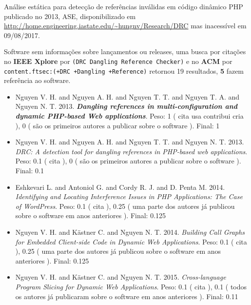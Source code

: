 Análise estática para detecção de referências inválidas em código dinâmico PHP
publicado no 2013, ASE,
disponibilizado em \url{http://home.engineering.iastate.edu/~hungnv/Research/DRC}
mas inacessível em 09/08/2017.

Software sem informações sobre lançamentos ou releases,
uma busca por citações no {\bf IEEE Xplore} por
\texttt{(DRC Dangling Reference Checker)}
e no {\bf ACM} por
\texttt{content.ftsec:(+DRC +Dangling +Reference)}
retornou
19 resultados,
{\bf 5} fazem referência ao software.

\begin{itemize}
\item Nguyen V. H. and Nguyen A. H. and Nguyen T. T. and Nguyen T. A. and Nguyen N. T.
      2013.
        \textbf{\textit{ Dangling references in multi-configuration and dynamic PHP-based Web applications}}.
      Peso:
      1 (
          cita
          usa
          contribui
          cria
      ),
      0 (
são os primeiros autores a publicar sobre o software
      ).
      Final:
      1

\item Nguyen V. H. and Nguyen A. H. and Nguyen T. T. and Nguyen N. T.
      2013.
        \textit{ DRC: A detection tool for dangling references in PHP-based web applications}.
      Peso:
      0.1 (
          cita
      ),
      0 (
são os primeiros autores a publicar sobre o software
      ).
      Final:
      0.1

\item Eshkevari L. and Antoniol G. and Cordy R. J. and D. Penta M.
      2014.
        \textit{ Identifying and Locating Interference Issues in PHP Applications: The Case of WordPress}.
      Peso:
      0.1 (
          cita
      ),
      0.25 (
uma parte dos autores já publicou sobre o software em anos anteriores
      ).
      Final:
      0.125

\item Nguyen V. H. and K\"{a}stner C. and Nguyen N. T.
      2014.
        \textit{ Building Call Graphs for Embedded Client-side Code in Dynamic Web Applications}.
      Peso:
      0.1 (
          cita
      ),
      0.25 (
uma parte dos autores já publicou sobre o software em anos anteriores
      ).
      Final:
      0.125

\item Nguyen V. H. and K\"{a}stner C. and Nguyen N. T.
      2015.
        \textit{ Cross-language Program Slicing for Dynamic Web Applications}.
      Peso:
      0.1 (
          cita
      ),
      0.1 (
todos os autores já publicaram sobre o software em anos anteriores
      ).
      Final:
      0.11

\end{itemize}

